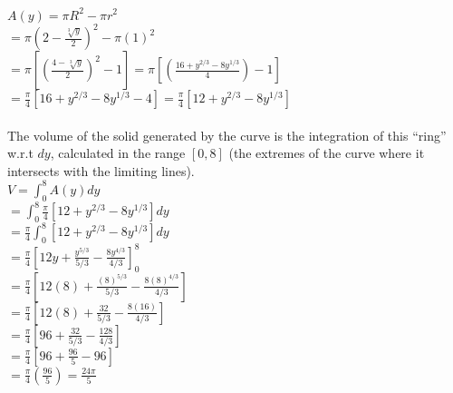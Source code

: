 \documentclass{article}
\begin{document}
{   $ A(y) = \pi{R}^2-\pi{r}^2 $ \\

   $ = \pi(2-\frac{\sqrt[3]{y}}{2})^2 - \pi{(1)}^2 $\\

   $ = \pi \left[ (\frac{4-\sqrt[3]{y}}{2})^2 - 1 \right]
   = \pi \left[ (\frac{16+{y}^{2/3}-8{y}^{1/3}}{4}) - 1 \right] $\\
   
   $ = \frac{\pi}{4} \left[ 16 + {y}^{2/3} - 8{y}^{1/3} - 4 \right]
   = \frac{\pi}{4} \left[ 12 + {y}^{2/3} - 8{y}^{1/3} \right] $\\\\

   The volume of the solid generated by the curve is 
   the integration of this ``ring'' w.r.t $dy$,
   calculated in the range $[0,8]$
   (the extremes of the curve where it intersects with the limiting lines).\\
   
   $ V = \int_{0}^{8}{A(y)} dy $\\

   $ = \int_{0}^{8}{\frac{\pi}{4} \left[ 12 + {y}^{2/3} - 8{y}^{1/3} \right]} dy $\\

   $ = \frac{\pi}{4} \int_{0}^{8}{\left[ 12 + {y}^{2/3} - 8{y}^{1/3} \right]} dy $\\
   
   $ = \frac{\pi}{4} \left[ 12y + \frac{{y}^{5/3}}{5/3} - \frac{8{y}^{4/3}}{4/3} \right]_{0}^{8} $\\
   
   $ = \frac{\pi}{4} \left[ 12(8) + \frac{{(8)}^{5/3}}{5/3} - \frac{8{(8)}^{4/3}}{4/3} \right] $\\

   $ = \frac{\pi}{4} \left[ 12(8) + \frac{{32}}{5/3} - \frac{8{(16)}}{4/3} \right] $\\

   $ = \frac{\pi}{4} \left[ 96 + \frac{32}{5/3} - \frac{128}{4/3} \right] $\\

   $ = \frac{\pi}{4} \left[ 96 + \frac{96}{5} - 96 \right] $\\
   
   $ = \frac{\pi}{4} (\frac{96}{5})
   = \boxed{\frac{24\pi}{5}} $\\
}
\end{document}
